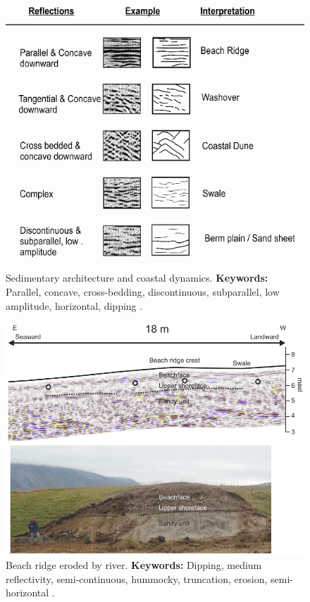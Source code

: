 \begin{figure}[h!]
    \centering
    \includegraphics[width=0.9\linewidth]{Figures/0.2GPR/Shukla2013_Coastal_margin.png}
    \caption[Sedimentary architecture and coastal dynamics.]{Sedimentary architecture and coastal dynamics. \textbf{Keywords: } Parallel, concave, cross-bedding, discontinuous, subparallel, low amplitude, horizontal, dipping \citep{Shukla2013}.}
    \label{fig:Shukla2013-1}
\end{figure}

\begin{figure}[h!]
    \centering
    \includegraphics[width=0.9\linewidth]{Figures/0.2GPR/Nielsen_2017_beach.png}
    \caption[Beach ridge eroded by river.]{Beach ridge eroded by river. \textbf{Keywords: } Dipping, medium reflectivity, semi-continuous, hummocky, truncation, erosion, semi-horizontal \citep{Nielsen2017}.}
    \label{fig:Nielsen2017-beach-1}
\end{figure}


